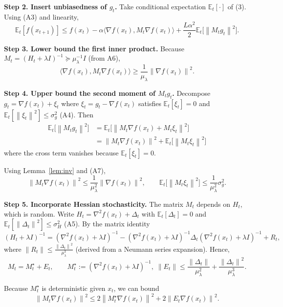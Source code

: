 \documentclass{article}
\newcommand{\E}{\mathbb{E}}
\newcommand{\norm}[1]{\left\|#1\right\|}
\newcommand{\inner}[2]{\langle #1,#2\rangle}
\begin{document}
\noindent\textbf{Step 2. Insert unbiasedness of $g_{t}$.}  
Take conditional expectation $\E_{t}[\cdot]$ of (3). Using (A3) and linearity,
\[
\E_{t}[f(x_{t+1})]\le f(x_{t})-\alpha\inner{\nabla f(x_{t})}{M_{t}\nabla f(x_{t})}
   +\frac{L\alpha^{2}}{2}\E_{t}\!\big[\norm{M_{t}g_{t}}^{2}\big]. \tag{4}
\]

\noindent\textbf{Step 3. Lower bound the first inner product.}  
Because $M_{t}=(H_{t}+\lambda I)^{-1}\succeq \mu_{\lambda}^{-1}I$ (from A6),
\[
\inner{\nabla f(x_{t})}{M_{t}\nabla f(x_{t})}
\ge \frac{1}{\mu_{\lambda}}\norm{\nabla f(x_{t})}^{2}. \tag{5}
\]

\noindent\textbf{Step 4. Upper bound the second moment of $M_{t}g_{t}$.}  
Decompose $g_{t}=\nabla f(x_{t})+\xi_{t}$ where $\xi_{t}=g_{t}-\nabla f(x_{t})$ satisfies $\E_{t}[\xi_{t}]=0$ and $\E_{t}[\norm{\xi_{t}}^{2}]\le\sigma_{g}^{2}$ (A4). Then
\[
\begin{aligned}
\E_{t}\!\big[\norm{M_{t}g_{t}}^{2}\big]
&=\E_{t}\!\big[\norm{M_{t}\nabla f(x_{t})+M_{t}\xi_{t}}^{2}\big] \\
&= \norm{M_{t}\nabla f(x_{t})}^{2}
   +\E_{t}\!\big[\norm{M_{t}\xi_{t}}^{2}\big] \tag{6}
\end{aligned}
\]
where the cross term vanishes because $\E_{t}[\xi_{t}]=0$.

Using Lemma~\ref{lem:inv} and (A7),
\[
\norm{M_{t}\nabla f(x_{t})}^{2}\le\frac{1}{\mu_{\lambda}^{2}}\norm{\nabla f(x_{t})}^{2},\qquad
\E_{t}\!\big[\norm{M_{t}\xi_{t}}^{2}\big]\le\frac{1}{\mu_{\lambda}^{2}}\sigma_{g}^{2}. \tag{7}
\]

\noindent\textbf{Step 5. Incorporate Hessian stochasticity.}  
The matrix $M_{t}$ depends on $H_{t}$, which is random. Write $H_{t}= \nabla^{2}f(x_{t})+\Delta_{t}$ with $\E_{t}[\Delta_{t}]=0$ and $\E_{t}[\norm{\Delta_{t}}^{2}]\le\sigma_{H}^{2}$ (A5). By the matrix identity
\[
(H_{t}+\lambda I)^{-1}= (\nabla^{2}f(x_{t})+\lambda I)^{-1}
    -(\nabla^{2}f(x_{t})+\lambda I)^{-1}\Delta_{t}(\nabla^{2}f(x_{t})+\lambda I)^{-1}+R_{t},
\]
where $\|R_{t}\|\le \frac{\norm{\Delta_{t}}^{2}}{\mu_{\lambda}^{3}}$ (derived from a Neumann series expansion). Hence,
\[
M_{t}=M^{\star}_{t}+E_{t},
\qquad
M^{\star}_{t}:=(\nabla^{2}f(x_{t})+\lambda I)^{-1},\;
\|E_{t}\|\le \frac{\norm{\Delta_{t}}}{\mu_{\lambda}^{2}}+\frac{\norm{\Delta_{t}}^{2}}{\mu_{\lambda}^{3}}. \tag{8}
\]

Because $M^{\star}_{t}$ is deterministic given $x_{t}$, we can bound
\[
\norm{M_{t}\nabla f(x_{t})}^{2}
\le 2\norm{M^{\star}_{t}\nabla f(x_{t})}^{2}+2\norm{E_{t}\nabla f(x_{t})}^{2}. \tag{9}
\]
\end{document}
